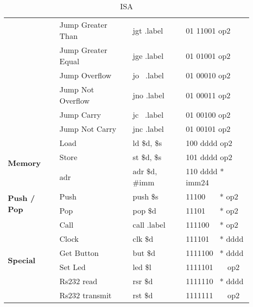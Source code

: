 \begin{table}[H]
{\begin{tabular}{|p{2cm}|l|l|l|}
 & Jump Greater Than & jgt .label & 01 11001 op2 \\ \cline{ 2- 4}
 & Jump Greater Equal & jge .label & 01 01001 op2 \\ \cline{ 2- 4}
 & Jump Overflow & jo \ .label & 01 00010 op2 \\ \cline{ 2- 4}
 & Jump Not Overflow & jno .label & 01 00011 op2 \\ \cline{ 2- 4}
 & Jump Carry & jc \ .label & 01 00100 op2 \\ \cline{ 2- 4}
 & Jump Not Carry & jnc .label & 01 00101 op2 \\ \hline
\multirow{3}{*}{\textbf{Memory}} & Load & ld \$d, \$s & 100 dddd op2 \\ \cline{ 2- 4}
 & Store & st \$d, \$s & 101 dddd op2 \\ \cline{ 2- 4}
 & adr & adr \$d, \#imm & 110 dddd * imm24 \\ \hline
\multirow{2}{*}{\parbox{2cm}{\textbf{Push / Pop}}} & Push & push \$s & 11100 \ \ \ * op2 \\ \cline{ 2- 4}
 & Pop & pop \$d & 11101 \ \ \ * op2 \\ \hline
\multirow{6}{*}{\textbf{Special}} & Call & call .label & 111100 \ \ * op2 \\ \cline{ 2- 4}
 & Clock & clk \$d & 111101 \ \ * dddd \\ \cline{ 2- 4}
 & Get Button & but \$d & 1111100 \ * dddd \\ \cline{ 2- 4}
 & Set Led & led \$l & 1111101 \ \ \ op2 \\ \cline{ 2- 4}
 & Rs232 read & rsr \$d & 1111110 \ * dddd \\ \cline{ 2- 4}
 & Rs232 transmit & rst \$d & 1111111 \ \ \ op2 \\ \hline
\end{tabular}
}
\caption{ISA}
\label{AP:ISA}
\end{table}